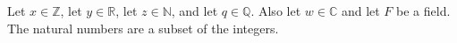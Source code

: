 Let $x \in \mathbb{Z}$, let $y \in \mathbb{R}$, let $z \in \mathbb{N}$, and let $q \in \mathbb{Q}$.
Also let $w \in \mathbb{C}$ and let $F$ be a field.
The natural numbers are a subset of the integers.